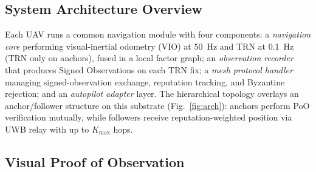 \documentclass[journal,10pt,twocolumn]{IEEEtran}
\begin{document}
\subsection{System Architecture Overview}

Each UAV runs a common navigation module with four components: a \emph{navigation core} performing visual-inertial odometry (VIO) at 50~Hz and TRN at 0.1~Hz (TRN only on anchors), fused in a local factor graph; an \emph{observation recorder} that produces Signed Observations on each TRN fix; a \emph{mesh protocol handler} managing signed-observation exchange, reputation tracking, and Byzantine rejection; and an \emph{autopilot adapter} layer. The hierarchical topology overlays an anchor/follower structure on this substrate (Fig.~\ref{fig:arch}): anchors perform PoO verification mutually, while followers receive reputation-weighted position via UWB relay with up to $K_\text{max}$ hops.

\subsection{Visual Proof of Observation}
\end{document}
